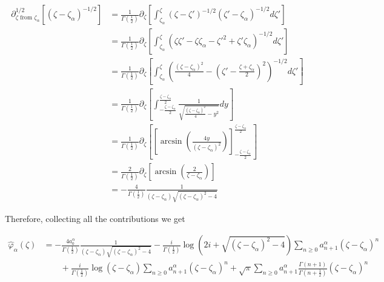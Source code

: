 \documentclass{article}
\begin{document}
\begin{align*}
\partial_{\zeta \text{ from } \zeta_\alpha}^{1/2}\left[(\zeta-\zeta_\alpha)^{-1/2}\right]&=\frac{1}{\Gamma\left(\tfrac{1}{2}\right)}\partial_\zeta\left[\int_{\zeta_\alpha}^{\zeta}(\zeta-\zeta')^{-1/2}(\zeta'-\zeta_\alpha)^{-1/2}d\zeta'\right]\\
&=\frac{1}{\Gamma\left(\tfrac{1}{2}\right)}\partial_{\zeta}\left[\int_{\zeta_\alpha}^{\zeta}(\zeta\zeta'-\zeta\zeta_\alpha-\zeta'^2+\zeta'\zeta_\alpha)^{-1/2}d\zeta'\right]\\
&=\frac{1}{\Gamma\left(\tfrac{1}{2}\right)}\partial_{\zeta}\left[\int_{\zeta_\alpha}^{\zeta}\left(\frac{(\zeta-\zeta_\alpha)^2}{4}-\left(\zeta'-\frac{\zeta+\zeta_\alpha}{2}\right)^2\right)^{-1/2}d\zeta'\right]\\
&=\frac{1}{\Gamma\left(\tfrac{1}{2}\right)}\partial_{\zeta}\left[\int_{-\tfrac{\zeta-\zeta_{\alpha}}{2}}^{\tfrac{\zeta-\zeta_{\alpha}}{2}}\frac{1}{\sqrt{\tfrac{(\zeta-\zeta_{\alpha})^2}{4}-y^2}}dy\right]\\
&=\frac{1}{\Gamma\left(\tfrac{1}{2}\right)}\partial_{\zeta}\left[\left[\arcsin\left(\tfrac{4y}{(\zeta-\zeta_{\alpha})^2}\right)\right]_{-\tfrac{\zeta-\zeta_{\alpha}}{2}}^{\tfrac{\zeta-\zeta_{\alpha}}{2}}\right]\\
&=\frac{2}{\Gamma\left(\tfrac{1}{2}\right)}\partial_{\zeta}\left[\arcsin\left(\tfrac{2}{\zeta-\zeta_\alpha}\right)\right]\\
&=-\frac{4}{\Gamma\left(\tfrac{1}{2}\right)}\frac{1}{(\zeta-\zeta_\alpha)\sqrt{(\zeta-\zeta_{\alpha})^2-4}}
\end{align*}

Therefore, collecting all the contributions we get

\begin{align*}
\hat{\varphi}_{\alpha}(\zeta)&=-\frac{4a_0^{\alpha}}{\Gamma\left(\tfrac{1}{2}\right)}\frac{1}{(\zeta-\zeta_\alpha)\sqrt{(\zeta-\zeta_{\alpha})^2-4}}-\frac{i}{\Gamma\left(\tfrac{1}{2}\right)}\log(2i+\sqrt{(\zeta-\zeta_\alpha)^2-4})\sum_{n\geq 0}a_{n+1}^{\alpha}(\zeta-\zeta_{\alpha})^{n}\\
&\qquad +\frac{i}{\Gamma\left(\tfrac{1}{2}\right)}\log(\zeta-\zeta_{\alpha})\sum_{n\geq 0}a_{n+1}^{\alpha}(\zeta-\zeta_{\alpha})^{n}+\sqrt{\pi}\sum_{n\geq 0}a_{n+1}^{\alpha}\tfrac{\Gamma(n+1)}{\Gamma(n+\tfrac{1}{2})}(\zeta-\zeta_{\alpha})^{n}
\end{align*}




\end{document}
